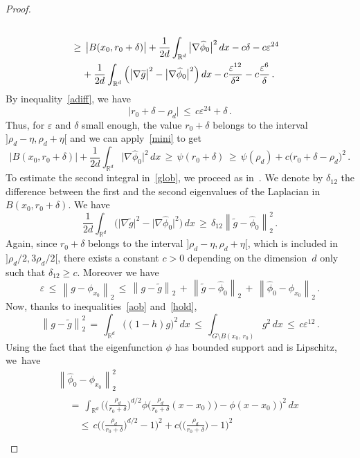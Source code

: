 \documentclass[AHL, Unicode, longabstracts, published]{cedram}
\newcommand*\Rd {{\mathbb R^d}}
\newcommand*\hp{{\widehat \phi}}
\newcommand*\gt{\widetilde g}
\begin{document}
\begin{proof}
\begin{multline}
\begin{aligned}
\\
&\geq\,\big|B(x_0,r_0+\delta)\big| +\frac{1}{2d}
\int_{\Rd}\big|\nabla \hp_0\big|^2\,dx -c\delta -c\varepsilon^{24}\\
&\mkern20mu+\frac{1}{2d}
\int_{\Rd}\Big(\big|\nabla \gt\big|^2 -\big|\nabla \hp_0\big|^2\Big)\,dx -c
\frac{\varepsilon^{12}}{\delta^2}- c
\frac{\varepsilon^{6}}{\delta}
\,.
\end{aligned}
\end{multline}
By inequality~\eqref{adiff}, we have
\begin{equation}\label{ulto}
\big|r_0+\delta-\rho_d\big|\,\leq\, c\varepsilon^{24}+\delta\,.
\end{equation}
Thus, for $\varepsilon$ and $\delta$ small enough, the value $r_0+\delta$ belongs to the interval $]\rho_d-\eta,\rho_d+\eta[$ and we can apply~\eqref{mini} to get
\begin{equation}\label{intert}
\big|B(x_0,r_0+\delta)\big| +\frac{1}{2d}
\int_{\Rd}\big|\nabla \hp_0\big|^2\,dx
\,\geq\,\psi (r_0+\delta)
\,\geq\,
\psi(\rho_d)+c\big(r_0+\delta-\rho_d\big)^2\,.
\end{equation}
To estimate the second integral in~\eqref{glob}, we proceed as in~\cite[Lemma~$A.1$]{BO}. We denote by $\delta_{12}$ the difference between the first and the second eigenvalues of the Laplacian in $B(x_0,r_0+\delta)$. We have
\[
\frac{1}{2d}
\int_{\Rd}\Big(\big|\nabla \gt\big|^2 -\big|\nabla \hp_0\big|^2\Big)\,dx
\,\geq\,
\delta_{12}\left\|\gt-\hp_0\right\|_2^2\,.
\]
Again, since $r_0+\delta$ belongs to the interval $]\rho_d-\eta,\rho_d+\eta[$, which is included in $]\rho_d/2,3\rho_d/2[$, there exists a constant $c>0$ depending on the dimension~$d$ only such that $\delta_{12}\geq c$. Moreover we have
\[
\varepsilon\,\leq\,\left\|g-\phi_{x_0}\right\|_2\,\leq\, \left\|g-\gt\right\|_2\,+\, \left\|\gt-\hp_0\right\|_2\,+\, \left\|\hp_0-\phi_{x_0}\right\|_2\,.
\]
Now, thanks to inequalities~\eqref{aob} and~\eqref{hold},
\[
\left\|g-\gt\right\|_2^2\,=\,
\int_{\Rd}\big((1-h)g\big)^2\,dx\,\leq\,
\int_{G\setminus B(x_0,\,r_0)}g^2\,dx\,\leq\, c {\varepsilon^{12}}\,.
\]
Using the fact that the eigenfunction $\phi$ has bounded support and is Lipschitz, we~have
\begin{multline*}
\left\|\hp_0-\phi_{x_0}\right\|_2^2
\\
\begin{aligned}
&=\,\int_{\Rd}
\Bigg(
\Big(\frac{\rho_d}{r_0+\delta}\Big)^{d/2}
\phi\Big(
\frac{\rho_d}{r_0+\delta}(x-x_0)\Big) -\phi(x-x_0)\Bigg)^2\,dx\\
&\quad\leq\, c\Bigg(\Big(\frac{\rho_d}{r_0+\delta}\Big)^{d/2}-1\Bigg)^2 +c\Bigg(\Big(\frac{\rho_d}{r_0+\delta}\Big)-1\Bigg)^2\\

\end{aligned}
\end{multline*}
\end{proof}
\end{document}
